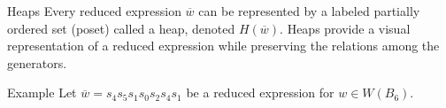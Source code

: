 \documentclass{beamer}
\newcommand{\w}{\overline{w}}
\newcommand\heapblock[4]{\fill[fill=#4, fill opacity=0.35, draw=#4, line width=1.1pt, rounded corners,shift={(\xxaxis:#1)},shift={(\yyaxis:#2)}] (-1,-1) rectangle (1,1);\node at (#1,#2) {\footnotesize $#3$};}
\newcommand\xxaxis{0}
\newcommand\yyaxis{90}
\begin{document}
\begin{frame}{Heaps}
Every reduced expression $\w$ can be represented by a labeled partially ordered set (poset) called a heap, denoted $H(\w)$. Heaps provide a visual representation of a reduced expression while preserving the relations among the generators.

\pause

\begin{block}{Example}
Let $\w=s_4s_5s_1s_0s_2s_4s_1$ be a reduced expression for $w \in W(B_6)$.
\begin{columns}
\begin{column}{0.4\textwidth}
\begin{figure}\centering
{}	
\end{figure}
\end{column}
\pause
\begin{column}{0.4\textwidth}
\begin{figure}\centering
{}
\end{figure}	
\end{column}
\end{columns}
\end{block}
	
\end{frame}

\end{document}
